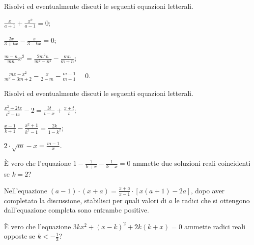 \begin{esercizio}[\Ast]
 \label{ese:3.56}
Risolvi ed eventualmente discuti le seguenti equazioni letterali.
\begin{multicols}{2}
\begin{enumeratea}
\item $\frac{x}{a + 1} + \frac{x^{2}}{a-1} = 0$;
\item $\frac{2 x}{3 + k x}-\frac{x}{3-k x}=0$;
\item $\frac{m-n}{m n} x^{2}=\frac{2 m^{2} n}{m^{2}-n^{2}}-\frac{m n}{m + n}$;
\item $\frac{m x-x^{2}}{m^{2}-3 m + 2}-\frac{x}{2-m} -\frac{m + 1}{m-1}=0$.
\end{enumeratea}
\end{multicols}
\end{esercizio}
\newpage
\begin{esercizio}[\Ast]
 \label{ese:3.57}
Risolvi ed eventualmente discuti le seguenti equazioni letterali.
\begin{multicols}{2}
\begin{enumeratea}
\item $\frac{x^{2} + 2 t x}{t^{2}-t x}-2=\frac{3 t}{t-x}+ \frac{x + t}{t}$;
\item $\frac{x-1}{k + 1}-\frac{x^{2} + 1}{k^{2}-1} =\frac{2 k}{1-k^{2}}$;
\item $2 \cdot \sqrt{m}-x=\frac{m-1}{x}$.
\end{enumeratea}
\end{multicols}
\end{esercizio}

\begin{esercizio}
 \label{ese:3.58}
È vero che l’equazione $1-\frac{1}{k + x}-\frac{1}{k-x}=0$ ammette due soluzioni reali coincidenti se $k = 2$?
\end{esercizio}

\begin{esercizio}
 \label{ese:3.59}
Nell’equazione $(a-1) \cdot (x + a)=\frac{x + a}{x-1} \cdot [ x (a +1)-2 a ]$, dopo aver completato la discussione, stabilisci per quali valori di $a$ le
radici che si ottengono dall’equazione completa sono entrambe positive.
\end{esercizio}

\begin{esercizio}
 \label{ese:3.60}
È vero che l’equazione $3 k x^{2} + (x-k)^{2} + 2 k (k + x)=0$ ammette radici reali opposte se $k <-\frac{1}{3}$?
\end{esercizio}

